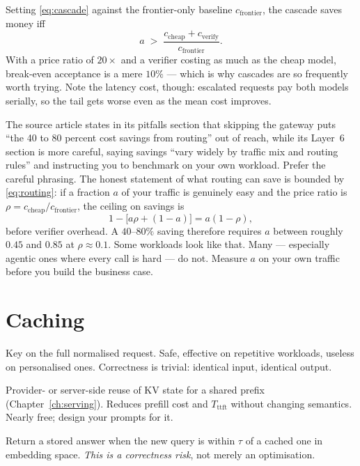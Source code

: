 \documentclass[11pt,twoside,openright]{book}
\theoremstyle{definition}
\theoremstyle{plain}
\theoremstyle{remark}
\newcommand{\ttft}{\ensuremath{T_{\mathrm{ttft}}}}
\begin{document}
Setting \eqref{eq:cascade} against the frontier-only baseline
$c_{\text{frontier}}$, the cascade saves money iff
\begin{equation}
  a \;>\; \frac{c_{\text{cheap}} + c_{\text{verify}}}{c_{\text{frontier}}} .
\label{eq:cascade-breakeven}
\end{equation}
With a price ratio of $20\times$ and a verifier costing as much as the cheap
model, break-even acceptance is a mere $10\%$ --- which is why cascades are so
frequently worth trying. Note the latency cost, though: escalated requests pay
both models serially, so the tail gets worse even as the mean cost improves.

\begin{vendorwatch}
The source article states in its pitfalls section that skipping the gateway puts
``the 40 to 80 percent cost savings from routing'' out of reach, while its
Layer~6 section is more careful, saying savings ``vary widely by traffic mix and
routing rules'' and instructing you to benchmark on your own workload. Prefer
the careful phrasing. The honest statement of what routing can save is bounded
by \eqref{eq:routing}: if a fraction $a$ of your traffic is genuinely easy and
the price ratio is $\rho = c_{\text{cheap}}/c_{\text{frontier}}$, the ceiling on
savings is
\[
  1 - \bigl[a\rho + (1-a)\bigr] = a(1-\rho),
\]
before verifier overhead. A $40$--$80\%$ saving therefore requires $a$ between
roughly $0.45$ and $0.85$ at $\rho \approx 0.1$. Some workloads look like that.
Many --- especially agentic ones where every call is hard --- do not. Measure
$a$ on your own traffic before you build the business case.
\end{vendorwatch}

\section{Caching}

\begin{description}[leftmargin=1.6em,style=nextline,itemsep=2pt]
  \item[Exact-match cache.] Key on the full normalised request. Safe, effective
        on repetitive workloads, useless on personalised ones. Correctness is
        trivial: identical input, identical output.
  \item[Prefix / prompt cache.] Provider- or server-side reuse of KV state for a
        shared prefix (Chapter~\ref{ch:serving}). Reduces prefill cost and
        \ttft{} without changing semantics. Nearly free; design your prompts for
        it.
  \item[Semantic cache.] Return a stored answer when the new query is within
        $\tau$ of a cached one in embedding space. \emph{This is a correctness
        risk}, not merely an optimisation.
\end{description}
\end{document}
